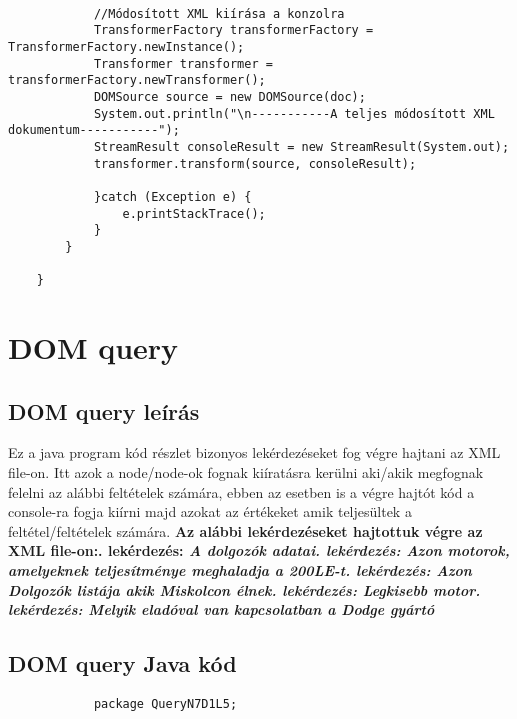 \documentclass[14pt]{extarticle}
\begin{document}
\begin{normalsize}
\begin{verbatim}
	        
	        //Módosított XML kiírása a konzolra
	        TransformerFactory transformerFactory = TransformerFactory.newInstance();
	        Transformer transformer = transformerFactory.newTransformer();
	        DOMSource source = new DOMSource(doc);
	        System.out.println("\n-----------A teljes módosított XML dokumentum-----------");
	        StreamResult consoleResult = new StreamResult(System.out);
	        transformer.transform(source, consoleResult);
			
		    }catch (Exception e) {
				e.printStackTrace();
		    }
		}

	}

		\end{verbatim}
		\section{DOM query}
		\subsection{DOM query leírás}
		\begin{normalsize}
			Ez a java program kód részlet bizonyos lekérdezéseket fog végre hajtani az XML file-on. Itt azok a node/node-ok fognak kiíratásra kerülni aki/akik megfognak felelni az alábbi feltételek számára, ebben az esetben is a végre hajtót kód a console-ra fogja kiírni majd azokat az értékeket amik teljesültek a feltétel/feltételek számára.\newline
			\bfseries Az alábbi lekérdezéseket hajtottuk végre az XML file-on:\mdseries{}. \bfseries lekérdezés: \mdseries\itshape A dolgozók adatai\upshape{}. \bfseries lekérdezés: \mdseries\itshape  Azon motorok, amelyeknek teljesítménye meghaladja a 200LE-t\upshape{}. \bfseries lekérdezés: \mdseries\itshape Azon Dolgozók listája akik Miskolcon élnek\upshape{}. \bfseries lekérdezés: \mdseries\itshape  Legkisebb motor\upshape{}. \bfseries lekérdezés: \mdseries\itshape Melyik eladóval van kapcsolatban a Dodge gyártó\newline\upshape

		\end{normalsize}
		\subsection{DOM query Java kód}
		\small
		\begin{verbatim}
			package QueryN7D1L5;


\end{verbatim}
\end{normalsize}
\end{document}
